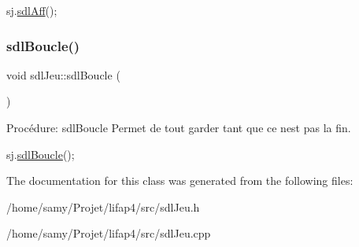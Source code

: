 \begin{DoxyCode}
sj.\hyperlink{classsdlJeu_aedada55e3f96ba37493664d358dc7b60}{sdlAff}();
\end{DoxyCode}
 \mbox{\label{classsdlJeu_a5628835d7efcab056985c3aa3de56836}} 
\subsubsection{\texorpdfstring{sdl\+Boucle()}{sdlBoucle()}}
{\footnotesize\ttfamily void sdl\+Jeu\+::sdl\+Boucle (\begin{DoxyParamCaption}{ }\end{DoxyParamCaption})}



Procédure\+: sdl\+Boucle Permet de tout garder tant que ce n\textquotesingle{}est pas la fin. 


\begin{DoxyCode}
sj.\hyperlink{classsdlJeu_a5628835d7efcab056985c3aa3de56836}{sdlBoucle}();
\end{DoxyCode}
 

The documentation for this class was generated from the following files\+:\begin{DoxyCompactItemize}
\item 
/home/samy/\+Projet/lifap4/src/sdl\+Jeu.\+h\item 
/home/samy/\+Projet/lifap4/src/sdl\+Jeu.\+cpp\end{DoxyCompactItemize}
